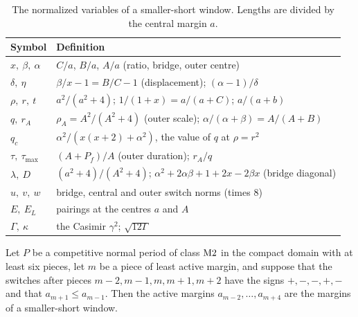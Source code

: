 \begin{table}[htbp]
\centering\small
\caption{The normalized variables of a smaller-short window. Lengths are divided by the central
margin $a$.}\label{tab:ss-variables}
\begin{tabular}{@{}ll@{}}
\toprule
Symbol & Definition \\
\midrule
$x,\ \beta,\ \alpha$ & $C/a$, $B/a$, $A/a$ (ratio, bridge, outer centre) \\
$\delta,\ \eta$ & $\beta/x-1=B/C-1$ (displacement); $(\alpha-1)/\delta$ \\
$\rho,\ r,\ t$ & $a^2/(a^2+4)$; $1/(1+x)=a/(a+C)$; $a/(a+b)$ \\
$q,\ r_A$ & $\rho_A=A^2/(A^2+4)$ (outer scale); $\alpha/(\alpha+\beta)=A/(A+B)$ \\
$q_c$ & $\alpha^2/(x(x+2)+\alpha^2)$, the value of $q$ at $\rho=r^2$ \\
$\tau,\ \tau_{\max}$ & $(A+P_f)/A$ (outer duration); $r_A/q$ \\
$\lambda,\ D$ & $(a^2+4)/(A^2+4)$; $\alpha^2+2\alpha\beta+1+2x-2\beta x$ (bridge diagonal) \\
$u,\ v,\ w$ & bridge, central and outer switch norms (times $8$) \\
$E,\ E_L$ & pairings at the centres $a$ and $A$ \\
$\Gamma,\ \kappa$ & the Casimir $\gamma^2$; $\sqrt{12\Gamma}$ \\
\bottomrule
\end{tabular}
\end{table}

\begin{proposition}\label{prop:ss-extraction}
Let $P$ be a competitive normal period of class $\mathrm{M2}$ in the compact domain with at least six
pieces, let $m$ be a piece of least active margin, and suppose that the switches after pieces
$m-2,m-1,m,m+1,m+2$ have the signs $+,-,-,+,-$ and that $a_{m+1}\le a_{m-1}$. Then the active
margins $a_{m-2},\dots,a_{m+4}$ are the margins of a smaller-short window.
\end{proposition}

